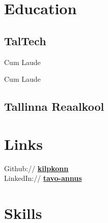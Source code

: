 \documentclass[letterpaper]{deedy-resume} %
\begin{document}
\begin{minipage}[t]{0.33\textwidth} %


\section{Education} 

\subsection{TalTech}

Cum Laude \\

\sectionspace %

Cum Laude \\

\sectionspace %

\subsection{Tallinna Reaalkool}


\sectionspace %


\section{Links} 

Github:// \href{https://github.com/kilpkonn}{\bf kilpkonn} \\
LinkedIn:// \href{https://www.linkedin.com/in/tavo-annus-4a5631171/}{\bf tavo-annus} \\

\sectionspace %


\section{Skills}


\end{minipage}
\end{document}
